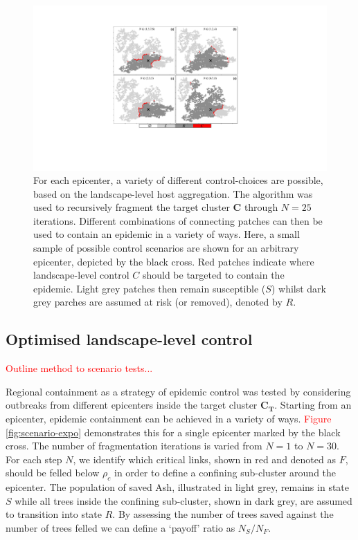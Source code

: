 \begin{figure}
    \centering
    \includegraphics[scale=0.575]{chapter7/figures/figure3-scenario-test.pdf}
    \caption{For each epicenter, a variety of different control-choices are possible, based on the landscape-level host aggregation. 
    The algorithm was used to recursively fragment the target cluster $\mathbf{C}$ through $N=25$ iterations. 
    Different combinations of connecting patches can then be used to contain an epidemic in a variety of ways.
    Here, a small sample of possible control scenarios are shown for an arbitrary epicenter, depicted by the black cross.
    Red patches indicate where landscape-level control $C$ should be targeted to contain the epidemic.
    Light grey patches then remain susceptible ($S$) whilst dark grey parches are assumed at risk (or removed), denoted by $R$.
     }
    \label{fig:my_label}
\end{figure}

\blindtext

\blindtext


\subsection{Optimised landscape-level control}

\textcolor{red}{Outline method to scenario tests...}

Regional containment as a strategy of epidemic control was tested by considering outbreaks from different epicenters inside the target cluster $\mathbf{C_T}$. 
Starting from an epicenter, epidemic containment can be achieved in a variety of ways. \textcolor{red}{Figure \ref{fig:scenario-expo}} demonstrates this for a single epicenter marked by the black cross. 
The number of fragmentation iterations is varied from $N=1$ to $N=30$. 
For each step $N$, we identify which critical links, shown in red and denoted as $F$, should be felled below $\rho_c$ in order to define a confining sub-cluster around the epicenter. 
The population of saved Ash, illustrated in light grey, remains in state $S$ while all trees inside the confining sub-cluster, shown in dark grey, are assumed to transition into state $R$. 
By assessing the number of trees saved against the number of trees felled we can define a `payoff' ratio as $N_S/N_F$.

